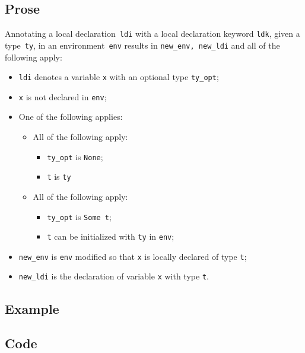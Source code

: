 \documentclass{book}
\begin{document}
  \subsection{Prose}
    Annotating a local declaration~\texttt{ldi} with a local declaration keyword \texttt{ldk}, given a type~\texttt{ty}, in
an environment~\texttt{env} results in \texttt{new\_env, new\_ldi} and all of
the following apply:
   \begin{itemize}
   \item \texttt{ldi} denotes a variable \texttt{x} with an optional type \texttt{ty\_opt};
   \item \texttt{x} is not declared in \texttt{env};
   \item One of the following applies:
     \begin{itemize}
     \item All of the following apply:
       \begin{itemize}
       \item \texttt{ty\_opt} is \texttt{None};
       \item \texttt{t} is \texttt{ty}
       \end{itemize}
     \item All of the following apply:
       \begin{itemize}
       \item \texttt{ty\_opt} is \texttt{Some t};
       \item \texttt{t} can be initialized with \texttt{ty} in \texttt{env};
       \end{itemize}
     \end{itemize}
   \item \texttt{new\_env} is \texttt{env} modified so that \texttt{x} is locally declared of type \texttt{t};
   \item \texttt{new\_ldi} is the declaration of variable \texttt{x} with type \texttt{t}.
   \end{itemize}

  \subsection{Example}

  \subsection{Code}
\end{document}
